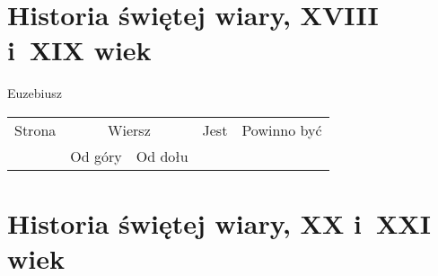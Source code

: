 \documentclass[a4paper,11pt]{article}
\begin{document}
\newpage

\section{Historia świętej wiary, XVIII i~XIX wiek}

\vspace{\spaceTwo}




\vspace{0em}



\vspace{0em}


\noindent
{} Euzebiusz \\




\begin{center}

  \begin{tabular}{|c|c|c|c|c|}
    \hline
    Strona & \multicolumn{2}{c|}{Wiersz} & Jest
                              & Powinno być \\ \cline{2-3}
    & Od góry & Od dołu & & \\
    \hline
    \hline
  \end{tabular}

\end{center}

\vspace{\spaceTwo}












\newpage

\section{Historia świętej wiary, XX i~XXI wiek}
\end{document}
